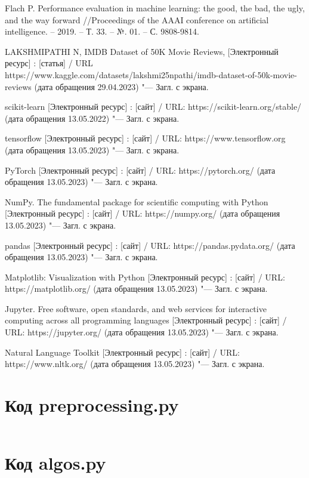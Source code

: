 \documentclass[bachelor, och, coursework]{SCWorks}
\begin{document}
\begin{thebibliography}{99}
     Flach P. Performance evaluation in machine learning: the
    good, the bad, the ugly, and the way forward //Proceedings of the AAAI
    conference on artificial intelligence. – 2019. – Т. 33. – №. 01. – С.
    9808-9814.

     LAKSHMIPATHI N, IMDB Dataset of 50K Movie Reviews,
    [Электронный ресурс] : [статья] / URL
    https://www.kaggle.com/datasets/lakshmi25npathi/imdb-dataset-of-50k-movie-reviews
    (дата обращения 29.04.2023) "--- Загл. с экрана.

     scikit-learn [Электронный ресурс] : [сайт] / URL:
    https://scikit-learn.org/stable/ (дата обращения 13.05.2022) "--- Загл. с
    экрана.

     tensorflow [Электронный ресурс] : [сайт] / URL:
    https://www.tensorflow.org (дата обращения 13.05.2023) "--- Загл. с экрана.

     PyTorch [Электронный ресурс] : [сайт] / URL:
    https://pytorch.org/ (дата обращения 13.05.2023) "--- Загл. с экрана.

     NumPy. The fundamental package for scientific computing
    with Python [Электронный ресурс] : [сайт] / URL: https://numpy.org/ (дата
    обращения 13.05.2023) "--- Загл. с экрана.

     pandas [Электронный ресурс] : [сайт] / URL:
    https://pandas.pydata.org/ (дата обращения 13.05.2023) "--- Загл. с экрана.

     Matplotlib: Visualization with Python [Электронный
    ресурс] : [сайт] / URL: https://matplotlib.org/ (дата обращения 13.05.2023)
    "--- Загл. с экрана.

     Jupyter. Free software, open standards, and web
    services for interactive computing across all programming languages
    [Электронный ресурс] : [сайт] / URL: https://jupyter.org/ (дата обращения
    13.05.2023) "--- Загл. с экрана.

     Natural Language Toolkit [Электронный ресурс] : [сайт] /
    URL: https://www.nltk.org/ (дата обращения 13.05.2023) "--- Загл. с экрана.

\end{thebibliography}

\appendix

    \section{Код preprocessing.py}
    \inputminted{py}{../movie-review-data/preprocessing.py}

    \section{Код algos.py}
    \inputminted{py}{../movie-review-data/algos.py}
\end{document}
